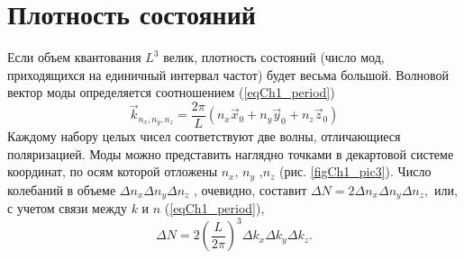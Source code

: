 \section{Плотность состояний}
Если объем квантования $L^3$ велик, плотность состояний (число мод,
приходящихся на единичный интервал частот) будет весьма
большой. Волновой вектор моды определяется соотношением
(\ref{eqCh1_period})
\begin{equation}
\vec{k}_{n_x, n_y, n_z} = \frac{2 \pi}{L}\left(n_x \vec{x}_0
+ n_y \vec{y}_0
+ n_z \vec{z}_0
\right)
\end{equation}
Каждому набору целых чисел соответствуют две волны, отличающиеся
поляризацией. Моды можно представить наглядно точками в декартовой
системе координат, по осям которой отложены  $n_x$, $n_y$  ,$n_z$
(рис. \ref{figCh1_pic3}). Число колебаний в объеме  
\(
\Delta n_x \Delta n_y \Delta n_z
\)
, очевидно, составит  
\(
\Delta N = 2 \Delta n_x \Delta n_y \Delta n_z,
\)
или, с учетом связи  
между  $k$  и  $n$  (\ref{eqCh1_period}),
\begin{equation}
\Delta N = 2 \left(\frac{L}{2 \pi} \right)^3 \Delta k_x \Delta k_y \Delta k_z.
\label{eqCh1_modenumber}
\end{equation}





